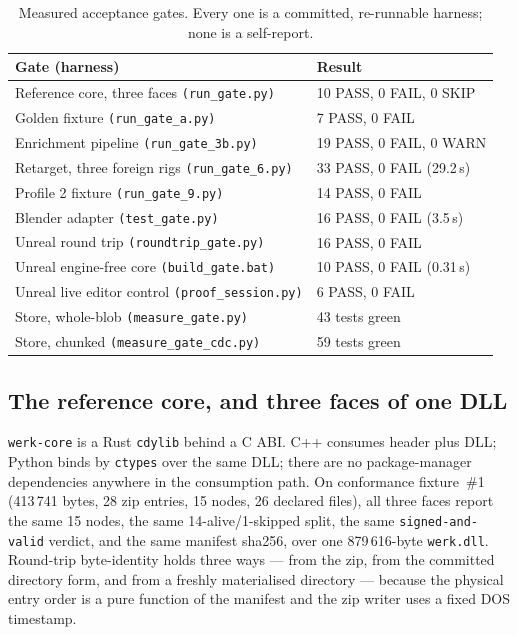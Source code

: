\documentclass[10pt,twocolumn,letterpaper]{article}
\newcommand{\code}[1]{\texttt{\small #1}}
\begin{document}
\begin{table}[t]
\caption{Measured acceptance gates. Every one is a committed, re-runnable
harness; none is a self-report.}
\label{tab:gates}
\small
\begin{tabular}{@{}L{5.0cm}L{3.2cm}@{}}
\toprule
Gate (harness) & Result \\
\midrule
Reference core, three faces \code{(run\_gate.py)} & 10 PASS, 0 FAIL, 0 SKIP \\
Golden fixture \code{(run\_gate\_a.py)} & 7 PASS, 0 FAIL \\
Enrichment pipeline \code{(run\_gate\_3b.py)} & 19 PASS, 0 FAIL, 0 WARN \\
Retarget, three foreign rigs \code{(run\_gate\_6.py)} & 33 PASS, 0 FAIL (29.2\,s) \\
Profile 2 fixture \code{(run\_gate\_9.py)} & 14 PASS, 0 FAIL \\
Blender adapter \code{(test\_gate.py)} & 16 PASS, 0 FAIL (3.5\,s) \\
Unreal round trip \code{(roundtrip\_gate.py)} & 16 PASS, 0 FAIL \\
Unreal engine-free core \code{(build\_gate.bat)} & 10 PASS, 0 FAIL (0.31\,s) \\
Unreal live editor control \code{(proof\_session.py)} & 6 PASS, 0 FAIL \\
Store, whole-blob \code{(measure\_gate.py)} & 43 tests green \\
Store, chunked \code{(measure\_gate\_cdc.py)} & 59 tests green \\
\bottomrule
\end{tabular}
\end{table}

\subsection{The reference core, and three faces of one DLL}
\label{sec:core}

\code{werk-core} is a Rust \code{cdylib} behind a C ABI. C++ consumes header plus
DLL; Python binds by \code{ctypes} over the same DLL; there are no package-manager
dependencies anywhere in the consumption path. On conformance fixture~\#1
(413\,741 bytes, 28 zip entries, 15 nodes, 26 declared files), all three faces
report the same 15 nodes, the same 14-alive/1-skipped split, the same
\code{signed-and-valid} verdict, and the same manifest sha256, over one
879\,616-byte \code{werk.dll}. Round-trip byte-identity holds three ways --- from
the zip, from the committed directory form, and from a freshly materialised
directory --- because the physical entry order is a pure function of the manifest
and the zip writer uses a fixed DOS timestamp.
\end{document}

